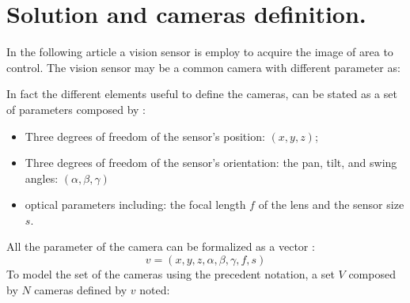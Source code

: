  \section*{ Solution and cameras definition.}
 In the following article a vision sensor is employ to acquire the image of area to control. The vision sensor may be a common camera with different parameter as:
% 

In fact the different elements useful to define the cameras, can be stated as a set of parameters composed by :\\
\begin{itemize}
\item Three degrees of freedom of the sensor’s position: $(x, y, z)$;
\item Three degrees of freedom of the sensor’s orientation: the pan, tilt, and swing angles: $(\alpha,\beta, \gamma)$ 
\item optical parameters including: the focal length $f$ of the lens and the sensor size $s$.
\end{itemize}
All the parameter of the camera can be formalized as a vector :
\begin{equation}\label{eq:v}
v=(x,y,z,\alpha ,\beta,\gamma,f,s)
\end{equation}
To model the set of the cameras using the precedent notation, a set $V$ composed by $N$ cameras defined by $v$ noted:

